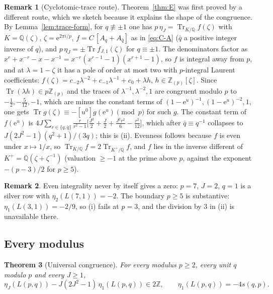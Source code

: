 \documentclass[11pt]{article}
\newtheorem{theorem}{Theorem}[section]
\theoremstyle{definition}
\newtheorem{remark}[theorem]{Remark}
\DeclareMathOperator{\Tr}{Tr}
\newcommand{\Z}{\mathbb Z}
\newcommand{\Q}{\mathbb Q}
\newcommand{\e}{\mathrm e}
\begin{document}
\begin{remark}[Cyclotomic-trace route]
\label{rem:trace-route}
Theorem~\ref{thm:E} was first proved by a different route, which we
sketch because it explains the shape of the congruence.  By
Lemma~\ref{lem:trace-form}, for $q\not\equiv\pm1$ one has
$p\,\eta_J=\Tr_{K/\Q}f(\zeta)$ with $K=\Q(\zeta)$, $\zeta=\e^{2\pi i/p}$,
$f=C\,[A_q+A_{\bar q}]$ as in \eqref{eq:C-A} ($\bar q$ a positive integer
inverse of $q$), and $p\,\eta_J=\pm\Tr f_{J,1}(\zeta)$ for $q\equiv\pm1$.
The denominators factor as
$x^r+x^{-r}-x-x^{-1}=x^{-r}(x^{r-1}-1)(x^{r+1}-1)$, so $f$ is integral
away from $p$, and at $\lambda=1-\zeta$ it has a pole of order at most
two with $p$-integral Laurent coefficients:
$f(\zeta)=c_{-2}\lambda^{-2}+c_{-1}\lambda^{-1}+c_0+\lambda h$,
$h\in\Z_{(p)}[\zeta]$.  Since $\Tr(\lambda h)\in p\Z_{(p)}$ and the
traces of $\lambda^{-1},\lambda^{-2},1$ are congruent modulo $p$ to
$-\tfrac12,-\tfrac5{12},-1$, which are minus the constant terms of
$(1-\e^u)^{-1},(1-\e^u)^{-2},1$, one gets
$\Tr g(\zeta)\equiv-[u^0]g(\e^u)\pmod p$ for such $g$.  The constant
term of $f(\e^u)$ is
$4J\sum_{r\in\{q,\bar q\}}\frac r{r^2-1}\bigl[\frac{J^2}2+\frac J2+\frac{J^2r^2}6-\frac{r^2}{12}\bigr]$,
which after $\bar q\equiv q^{-1}$ collapses to $J(2J^2-1)(q^2+1)/(3q)$;
this is (ii).  Evenness follows because $f$ is even under $x\mapsto1/x$,
so $\Tr_{K/\Q}f=2\Tr_{K^+/\Q}f$, and $f$ lies in the inverse different of
$K^+=\Q(\zeta+\zeta^{-1})$ (valuation $\geq-1$ at the prime above $p$,
against the exponent $-(p-3)/2$ for $p\geq5$).
\end{remark}

\begin{remark}
Even integrality never by itself gives a zero: $p=7$, $J=2$, $q=1$ is a
silver row with $\eta_2(L(7,1))=-2$.  The boundary $p\geq5$ is
substantive: $\eta_1(L(3,1))=-2/9$, so (i) fails at $p=3$, and the
division by $3$ in (ii) is unavailable there.
\end{remark}

\subsection{Every modulus}

\begin{theorem}[Universal congruence]
\label{thm:U}
For every modulus $p\geq2$, every unit $q$ modulo $p$ and every $J\geq1$,
\begin{equation}
 \eta_J(L(p,q))-J(2J^2-1)\,\eta_1(L(p,q))\in2\Z,\qquad
 \eta_1(L(p,q))=-4s(q,p).
 \label{eq:U}
\end{equation}
\end{theorem}
\end{document}
